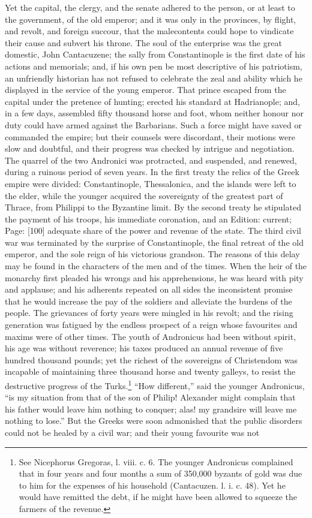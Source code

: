 Yet the capital, the clergy, and the senate adhered to the person, or at least to the government, of the old emperor; and it was only in the provinces, by flight, and revolt, and foreign succour, that the malecontents could hope to vindicate their cause and subvert his throne. The soul of the enterprise was the great domestic, John Cantacuzene; the sally from Constantinople is the first date of his actions and memorials; and, if his own pen be most descriptive of his patriotism, an unfriendly historian has not refused to celebrate the zeal and ability which he displayed in the service of the young emperor. That prince escaped from the capital under the pretence of hunting; erected his standard at Hadrianople; and, in a few days, assembled fifty thousand horse and foot, whom neither honour nor duty could have armed against the Barbarians. Such a force might have saved or commanded the empire; but their counsels were discordant, their motions were slow and doubtful, and their progress was checked by intrigue and negotiation. The quarrel of the two Andronici was protracted, and suspended, and renewed, during a ruinous period of seven years. In the first treaty the relics of the Greek empire were divided: Constantinople, Thessalonica, and the islands were left to the elder, while the younger acquired the sovereignty of the greatest part of Thrace, from Philippi to the Byzantine limit. By the second treaty he stipulated the payment of his troops, his immediate coronation, and an Edition: current; Page: [100] adequate share of the power and revenue of the state. The third civil war was terminated by the surprise of Constantinople, the final retreat of the old emperor, and the sole reign of his victorious grandson. The reasons of this delay may be found in the characters of the men and of the times. When the heir of the monarchy first pleaded his wrongs and his apprehensions, he was heard with pity and applause; and his adherents repeated on all sides the inconsistent promise that he would increase the pay of the soldiers and alleviate the burdens of the people. The grievances of forty years were mingled in his revolt; and the rising generation was fatigued by the endless prospect of a reign whose favourites and maxims were of other times. The youth of Andronicus had been without spirit, his age was without reverence; his taxes produced an annual revenue of five hundred thousand pounds; yet the richest of the sovereigns of Christendom was incapable of maintaining three thousand horse and twenty galleys, to resist the destructive progress of the Turks.\footnote{See Nicephorus Gregoras, l. viii. c. 6. The younger Andronicus complained that in four years and four months a sum of 350,000 byzants of gold was due to him for the expenses of his household (Cantacuzen. l. i. c. 48). Yet he would have remitted the debt, if he might have been allowed to squeeze the farmers of the revenue.} \texthebrew{“}How different,\texthebrew{}” said the younger Andronicus, \texthebrew{“}is my situation from that of the son of Philip! Alexander might complain that his father would leave him nothing to conquer; alas! my grandsire will leave me nothing to lose.\texthebrew{}” But the Greeks were soon admonished that the public disorders could not be healed by a civil war; and their young favourite was not 